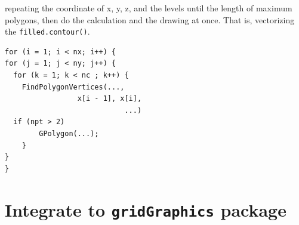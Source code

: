 \documentclass[paper=a4, fontsize=11pt]{report}
\begin{document}
repeating the coordinate of x, y, z, and the levels until the length of maximum polygons, then do the calculation and the drawing at once. That is, vectorizing the \texttt{filled.contour()}.\\



\begin{lstlisting}
for (i = 1; i < nx; i++) {
for (j = 1; j < ny; j++) {
  for (k = 1; k < nc ; k++) {
	FindPolygonVertices(...,
                 x[i - 1], x[i],
		                    ...)
  if (npt > 2)
	    GPolygon(...);
    }
}
}
\end{lstlisting}



\chapter{Integrate to \texttt{gridGraphics} package}
\end{document}
